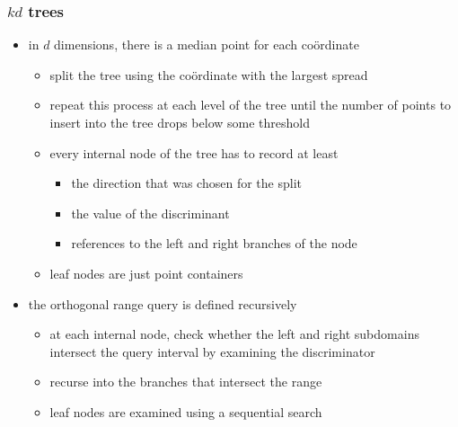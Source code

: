 \begin{frame}[fragile]
%
  \frametitle{$kd$ trees}
%
  \begin{itemize}
%
  \item in $d$ dimensions, there is a median point for each co\"ordinate
    \begin{itemize}
    \item split the tree using the co\"ordinate with the largest spread
    \item repeat this process at each level of the tree until the number of points to insert
      into the tree drops below some threshold
    \item every internal node of the tree has to record at least
      \begin{itemize}
      \item the direction that was chosen for the split
      \item the value of the discriminant
      \item references to the left and right branches of the node
      \end{itemize}
    \item leaf nodes are just point containers
    \end{itemize}
%
  \item the orthogonal range query is defined recursively
    \begin{itemize}
    \item at each internal node, check whether the left and right subdomains intersect the
      query interval by examining the discriminator
    \item recurse into the branches that intersect the range
    \item leaf nodes are examined using a sequential search
    \end{itemize}
%
  \end{itemize}
%
  \begin{figure}
    \begin{minipage}{0.75\linewidth}

\end{minipage}
\end{figure}
\end{frame}
